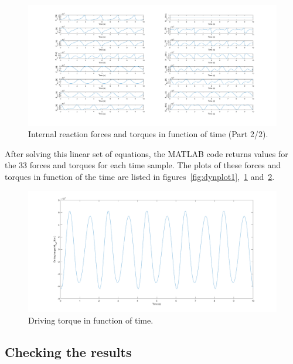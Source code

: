 \documentclass[a4paper]{article}
\begin{document}
\begin{figure}[h]
	\centering
	
	\includegraphics[width = .9\textwidth]{dynplot2.png}
	
	\caption{Internal reaction forces and torques in function of time (Part 2/2).}
	\label{fig:dynplot2}
	
\end{figure}

After solving this linear set of equations, the MATLAB code returns values for the 33 forces and torques for each time sample. The plots of these forces and torques in function of the time are listed in figures~\ref{fig:dynplot1},~\ref{fig:dynplot2} and~\ref{fig:dynplot3}.

\begin{figure}[h]
	\centering
	
	\includegraphics[width = \textwidth]{dynplot3.png}
	
	\caption{Driving torque in function of time.}
	\label{fig:dynplot3}
	
\end{figure}

\subsection{Checking the results}
\end{document}
